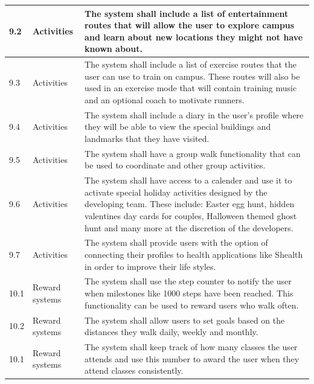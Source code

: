 \documentclass[12pt]{article}
\begin{document}
\begin{longtable}{|p{}| p{} | p{} |}
\hline

9.2& Activities & The system shall include a list of entertainment routes that will allow the user to explore campus and learn about new locations they might not have known about.\\

\hline

9.3& Activities & The system shall include a list of exercise routes that the user can use to train on campus. These routes will also be used in an exercise mode that will contain training music and an optional coach to motivate runners.\\

\hline

9.4& Activities & The system shall include a diary in the user's profile where they will be able to view the special buildings and landmarks that they have visited.\\

\hline

9.5& Activities & The system shall have a group walk functionality that can be used to coordinate  and other group activities.\\ 

\hline

9.6& Activities & The system shall have access to a calender and use it to activate special holiday activities designed by the developing team. These include: Easter egg hunt, hidden valentines day cards for couples, Halloween themed ghost hunt and many more at the discretion of the developers.\\

\hline

9.7& Activities & The system shall provide users with the option of connecting their profiles to health applications like Shealth in order to improve their life styles.\\

\hline

10.1& Reward systems & The system shall use the step counter to notify the user when milestones like 1000 steps have been reached. This functionality can be used to reward users who walk often.\\

\hline

10.2& Reward systems & The system shall allow users to set goals based on the distances they walk daily, weekly and monthly. \\

\hline

10.1& Reward systems & The system shall keep track of how many classes the user attends and use this number to award the user when they attend classes consistently.\\


\end{longtable}
\end{document}
